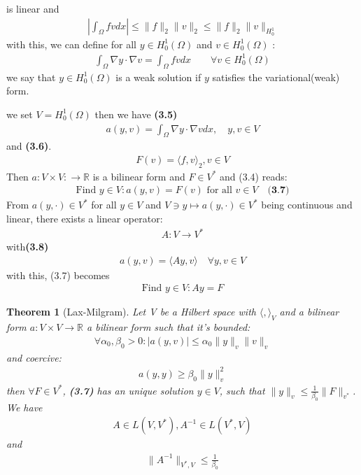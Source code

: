 \documentclass[a4paper,11pt,fleqn]{book}
\newtheorem{theorem}{Theorem}[section]
\theoremstyle{definition}
\theoremstyle{remark}
\begin{document}
is linear and 
\begin{align*}
	|\int_\Omega fv dx | \le \|f\|_2 \|v\|_2 \le \|f\|_2 \|v\|_{H^1_0}
\end{align*}
with this, we can define for all $y \in H^1_0(\Omega)$ and $v \in H^1_0(\Omega)$ :
\begin{align*}
	\int_\Omega \nabla y \cdot \nabla v = \int_\Omega fv dx \qquad \forall v \in H_0^1(\Omega)
\end{align*}
we say that $y \in H^1_0(\Omega)$ is a weak solution if $y$ satisfies the variational(weak) form. \par
we set $V = H^1_0(\Omega)$ then we have \textbf{(3.5)}
\begin{align*}
	a(y, v) = \int_\Omega \nabla y \cdot \nabla v dx , \quad y, v \in V
\end{align*}
and\textbf{ (3.6)}.
\begin{align*}
	F(v) = \langle f, v \rangle_2, v \in V
\end{align*}
Then $a: V \times V: \rightarrow \mathbb{R}$ is a bilinear form and $F \in V^*$ and (3.4) reads: 
\begin{align*}
	\text{Find } y \in V: a(y, v) = F(v) \text{ for all } v \in V
	\quad \textbf{(3.7)}
\end{align*}
From $a(y, \cdot) \in V^*$ for all $y \in V$ and  $V \ni y \mapsto a(y, \cdot) \in V^*$ being continuous and linear, there exists a linear operator:
\begin{align*}
	A: V \rightarrow V^*
\end{align*}
with\textbf{(3.8)}
\begin{align*}
	a(y, v) = \langle Ay, v \rangle \quad \forall y, v \in V
\end{align*}
with this, (3.7) becomes 
\begin{align*}
	\text{Find } y \in V: Ay = F
\end{align*}

\begin{theorem}[Lax-Milgram]
	Let V be a Hilbert space with $\langle, \rangle_V$ and a bilinear form $a: V \times V \rightarrow \mathbb{R}$ a bilinear form such that it's bounded:
	\begin{align*}
		\forall \alpha_0, \beta_0> 0: |a(y, v)| \le \alpha_0 \|y\|_v \|v\|_v
	\end{align*}
	and coercive:
	\begin{align*}
		a(y, y) \geq \beta_0\|y\|_v^2
	\end{align*}
	then $\forall F \in V^*$, \textbf{(3.7)  }has an unique solution $y \in V$, such that $\|y\|_v \le \frac{1}{\beta_0}\|F\|_{v^*}$. We have
	\begin{align*}
		A \in L(V, V^*), A^{-1} \in L(V^*, V)
	\end{align*}
	and 
	\begin{align*}
		\|A^{-1}\|_{V^*, V} \le \frac{1}{\beta_0}
	\end{align*}
\end{theorem}
\end{document}
